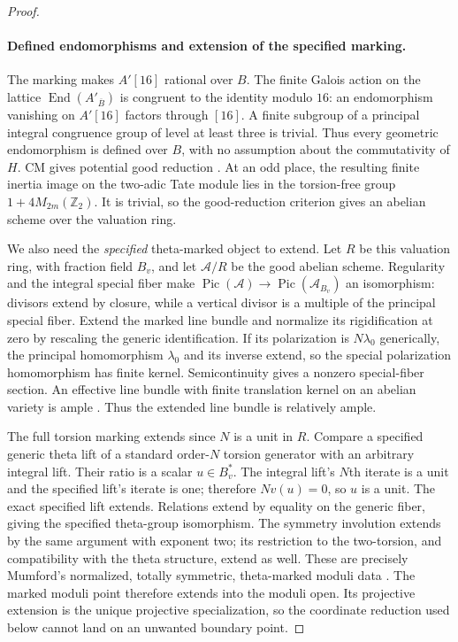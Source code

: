 \documentclass[11pt]{article}
\theoremstyle{definition}
\theoremstyle{remark}
\begin{document}
\begin{proof}
\paragraph{Defined endomorphisms and extension of the specified marking.}
The marking makes $A'[16]$ rational over $B$.  The finite Galois action on
the lattice $\operatorname{End}(A'_{\overline B})$ is congruent to the identity
modulo $16$: an endomorphism vanishing on $A'[16]$ factors through $[16]$.
A finite subgroup of a principal integral congruence group of level at
least three is trivial.  Thus every geometric endomorphism is defined over
$B$, with no assumption about the commutativity of $H$.
CM gives potential good reduction \citep[Theorem~6(a), p.~503]{SerreTate1968}.  At an odd place,
the resulting finite inertia image on the two-adic Tate module lies in the
torsion-free group $1+4M_{2m}(\mathbb Z_2)$.  It is trivial, so the
good-reduction criterion gives an abelian scheme over the valuation ring.

We also need the \emph{specified} theta-marked object to extend.
Let $R$ be this valuation ring, with fraction field $B_v$, and let
$\mathcal A/R$ be the good abelian scheme.  Regularity and the integral
special fiber make $\operatorname{Pic}(\mathcal A)\to
\operatorname{Pic}(\mathcal A_{B_v})$ an isomorphism: divisors extend by
closure, while a vertical divisor is a multiple of the principal special
fiber.  Extend the marked line bundle and normalize its rigidification at
zero by rescaling the generic identification.  If its polarization is
$N\lambda_0$ generically, the principal homomorphism $\lambda_0$ and its
inverse extend, so the special polarization homomorphism has finite kernel.
Semicontinuity gives a nonzero special-fiber section.  An effective line
bundle with finite translation kernel on an abelian variety is ample
\cite[Chapter II, Section 6, Application 1, pp.~60--61]{MumfordAV1970}.
Thus the extended line bundle is relatively ample.

The full torsion marking extends since $N$ is a unit in $R$.  Compare a
specified generic theta lift of a standard order-$N$ torsion generator with
an arbitrary integral lift.  Their ratio is a scalar $u\in B_v^*$.
The integral lift's $N$th iterate is a unit and the specified lift's iterate
is one; therefore $Nv(u)=0$, so $u$ is a unit.  The exact specified lift
extends.  Relations extend by equality on the generic fiber, giving the
specified theta-group isomorphism.  The symmetry involution extends by the
same argument with exponent two; its restriction to the two-torsion, and
compatibility with the theta structure, extend as well.  These are precisely
Mumford's normalized, totally symmetric, theta-marked moduli data
\cite[Section 6, pp.~76--79, 83]{Mumford1967}.
The marked moduli point therefore extends into the moduli open.  Its
projective extension is the unique projective specialization, so the
coordinate reduction used below cannot land on an unwanted boundary point.


\end{proof}
\end{document}
